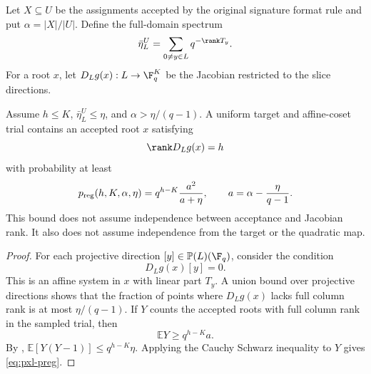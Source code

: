 Let $X\subseteq U$ be the assignments accepted by the original signature
format rule and put $\alpha=|X|/|U|$.  Define the full-domain spectrum
\begin{equation}
 \bar\eta_L^U=\sum_{0\ne y\in L}q^{-\rank T_y}.
 \label{eq:pxl-eta}
\end{equation}
For a root $x$, let $D_Lg(x):L\to\F_q^K$ be the Jacobian restricted to the
slice directions.

\begin{theorem}
\label{thm:sq-accepted-root}
Assume $h\le K$, $\bar\eta_L^U\le\eta$, and
$\alpha>\eta/(q-1)$.  A uniform target and affine-coset trial contains an
accepted root $x$ satisfying
\[
 \rank D_Lg(x)=h
\]
with probability at least
\begin{equation}
 p_{\rm reg}(h,K,\alpha,\eta)
 =q^{h-K}\frac{a^2}{a+\eta},
 \qquad
 a=\alpha-\frac{\eta}{q-1}.
 \label{eq:pxl-preg}
\end{equation}
This bound does not assume independence between acceptance and Jacobian rank.
It also does not assume independence from the target or the quadratic map.
\end{theorem}

\begin{proof}
For each projective direction $[y]\in\mathbb P(L)(\F_q)$, consider the
condition
\[
 D_Lg(x)[y]=0.
\]
This is an affine system in $x$ with linear part $T_y$.  A union
bound over projective directions shows that the fraction of points where
$D_Lg(x)$ lacks full column rank is at most $\eta/(q-1)$.  If $Y$ counts the
accepted roots with full column rank in the sampled trial, then
\[
 \mathbb EY\ge q^{h-K}a.
\]
By ,
$\mathbb E[Y(Y-1)]\le q^{h-K}\eta$.  Applying the Cauchy Schwarz inequality
to $Y$ gives
\eqref{eq:pxl-preg}.
\end{proof}

